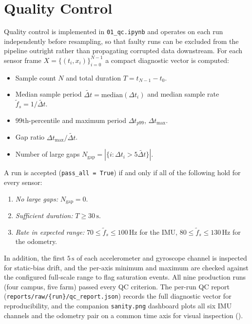 \newpage
\section{Quality Control}
\label{sec:qc_screening}

Quality control is implemented in \texttt{01\_qc.ipynb} and operates on each run independently before resampling, so that faulty runs can be excluded from the pipeline outright rather than propagating corrupted data downstream. For each sensor frame $X = \{(t_i, x_i)\}_{i=0}^{N-1}$ a compact diagnostic vector is computed:
\begin{itemize}
    \item Sample count $N$ and total duration $T = t_{N-1} - t_0$.
    \item Median sample period $\tilde{\Delta t} = \mathrm{median}(\Delta t_i)$ and median sample rate $\tilde{f}_s = 1/\tilde{\Delta t}$.
    \item 99th-percentile and maximum period $\Delta t_{p99}$, $\Delta t_{\max}$.
    \item Gap ratio $\Delta t_{\max} / \tilde{\Delta t}$.
    \item Number of large gaps $N_{\mathrm{gap}} = |\{i : \Delta t_i > 5\tilde{\Delta t}\}|$.
\end{itemize}
A run is accepted (\texttt{pass\_all = True}) if and only if all of the following hold for every sensor:
\begin{enumerate}
    \item \emph{No large gaps:} $N_{\mathrm{gap}} = 0$.
    \item \emph{Sufficient duration:} $T \ge 30\,\text{s}$.
    \item \emph{Rate in expected range:} $70 \le \tilde{f}_s \le 100\,\text{Hz}$ for the IMU, $80 \le \tilde{f}_s \le 130\,\text{Hz}$ for the odometry.
\end{enumerate}
In addition, the first $5\,\text{s}$ of each accelerometer and gyroscope channel is inspected for static-bias drift, and the per-axis minimum and maximum are checked against the configured full-scale range to flag saturation events. All nine production runs (four campus, five farm) passed every QC criterion. The per-run QC report (\texttt{reports/raw/\{run\}/qc\_report.\allowbreak json}) records the full diagnostic vector for reproducibility, and the companion \texttt{sanity.png} dashboard plots all six IMU channels and the odometry pair on a common time axis for visual inspection ().

